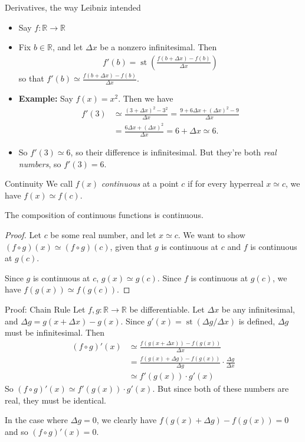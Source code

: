\documentclass{beamer}
\theoremstyle{plain}
\theoremstyle{definition}
\newcommand{\stp}[1]{\st\left(#1\right)}
\newcommand{\reals}{\mathbb{R}}
\DeclareMathOperator{\st}{st}
\begin{document}
\begin{frame}{Derivatives, the way Leibniz intended}
\begin{itemize}
	\item Say $f: \reals \to \reals$
	\item Fix $b \in \reals$, and let $\Delta x$ be a nonzero infinitesimal. Then 
	\begin{align*}
	f'(b) = \stp{\frac{f(b + \Delta x) - f(b)}{\Delta x}}
	\end{align*}
	so that $f'(b) \simeq \frac{f(b + \Delta x) - f(b)}{\Delta x}$.
	\item \textbf{Example:} Say $f(x) = x^2$. Then we have 
	\begin{align*}
	f'(3) &\simeq \frac{(3 + \Delta x)^2 - 3^2}{\Delta x} = \frac{9 + 6 \Delta x + (\Delta x)^2 - 9}{\Delta x} \\
		&= \frac{6 \Delta x + (\Delta x)^2}{\Delta x} = 6 + \Delta x \simeq 6.
	\end{align*}
	\item So $f'(3) \simeq 6$, so their difference is infinitesimal. But they're both \textit{real numbers}, so $f'(3) = 6$.
\end{itemize}
\end{frame}

\begin{frame}{Continuity}
	We call $f(x)$ \textit{continuous} at a point $c$ if for every hyperreal $x \simeq c$, we have $f(x) \simeq f(c)$.
	\begin{theorem}
		The composition of continuous functions is continuous.
	\end{theorem}
	\begin{proof}
		Let $c$ be some real number, and let $x \simeq c$. We want to show $(f \circ g)(x) \simeq (f \circ g)(c)$, given that $g$ is continuous at $c$ and $f$ is continuous at $g(c)$. 
		
		Since $g$ is continuous at $c$, $g(x) \simeq g(c)$. Since $f$ is continuous at $g(c)$, we have $f(g(x)) \simeq f(g(c))$.
	\end{proof}
\end{frame}

\begin{frame}{Proof: Chain Rule}
Let $f,g: \reals \to \reals$ be differentiable. Let $\Delta x$ be any infinitesimal, and $\Delta g = g(x + \Delta x) - g(x)$. Since $g'(x) = \st(\Delta g / \Delta x)$ is defined, $\Delta g$ must be infinitesimal. Then
\begin{align*}
(f \circ g)'(x) &\simeq \frac{f(g(x + \Delta x)) - f(g(x))}{\Delta x}  \\
	&= \frac{f(g(x) + \Delta g) - f(g(x))}{\Delta g} \cdot \frac{\Delta g}{\Delta x} \\ 
	&\simeq f'(g(x))\cdot g'(x)
\end{align*}
So $(f \circ g)'(x) \simeq f'(g(x)) \cdot g'(x)$. But since both of these numbers are real, they must be identical. \newline

In the case where $\Delta g = 0$, we clearly have $f(g(x) + \Delta g) - f(g(x)) = 0$ and so $(f \circ g)'(x) = 0$.
\end{frame}
\end{document}
